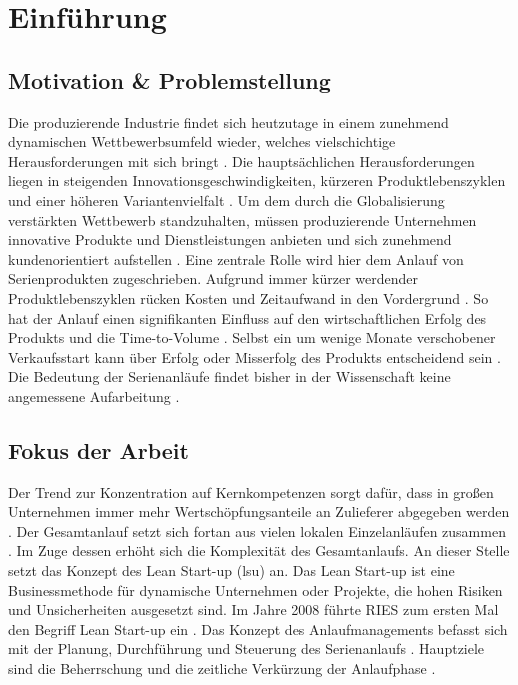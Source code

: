 \chapter{Einführung}\label{sec:einfuehrung}


\section{Motivation \& Problemstellung}
Die produzierende Industrie findet sich heutzutage in einem zunehmend dynamischen Wettbewerbsumfeld wieder, welches vielschichtige Herausforderungen mit sich bringt \cite{Renner2012}. Die hauptsächlichen Herausforderungen liegen in steigenden Innovationsgeschwindigkeiten, kürzeren Produktlebenszyklen und einer höheren Variantenvielfalt \cite{Kuhn2002,Stauder2016}. Um dem durch die Globalisierung verstärkten Wettbewerb standzuhalten, müssen produzierende Unternehmen innovative Produkte und Dienstleistungen anbieten und sich zunehmend kundenorientiert aufstellen \cite{Surbier2014}. 
Eine zentrale Rolle wird hier dem Anlauf von Serienprodukten zugeschrieben. Aufgrund immer kürzer werdender Produktlebenszyklen rücken Kosten und Zeitaufwand in den Vordergrund \cite{Winkler2007}. So hat der Anlauf einen signifikanten Einfluss auf den wirtschaftlichen Erfolg des Produkts und die Time-to-Volume \cite{Klocke16}. Selbst ein um wenige Monate verschobener Verkaufsstart kann über Erfolg oder Misserfolg des Produkts entscheidend sein \cite{Schuh2008a}. Die Bedeutung der Serienanläufe findet bisher in der Wissenschaft keine angemessene Aufarbeitung \cite{Dyckhoff2012}. 

\section{Fokus der Arbeit}

Der Trend zur Konzentration auf Kernkompetenzen sorgt dafür, dass in großen Unternehmen immer mehr Wertschöpfungsanteile an Zulieferer abgegeben werden  \cite{Hilmola2015, Wildemann2008}. Der Gesamtanlauf setzt sich fortan aus vielen lokalen Einzelanläufen zusammen \cite{Zimolong2006}. Im Zuge dessen erhöht sich die Komplexität des Gesamtanlaufs. An dieser Stelle setzt das Konzept des Lean Start-up (\gls{lsu}) an. Das Lean Start-up ist eine Businessmethode für dynamische Unternehmen oder Projekte, die hohen Risiken und Unsicherheiten ausgesetzt sind. 
Im Jahre 2008 führte RIES zum ersten Mal den Begriff Lean Start-up ein \cite{Ries2008}. 
Das Konzept des Anlaufmanagements befasst sich mit der Planung, Durchführung und Steuerung des Serienanlaufs \cite[S.8]{Kuhn2002}. Hauptziele sind die Beherrschung und die zeitliche Verkürzung der Anlaufphase \cite{Kuhn2002, Schmitt2015}.

